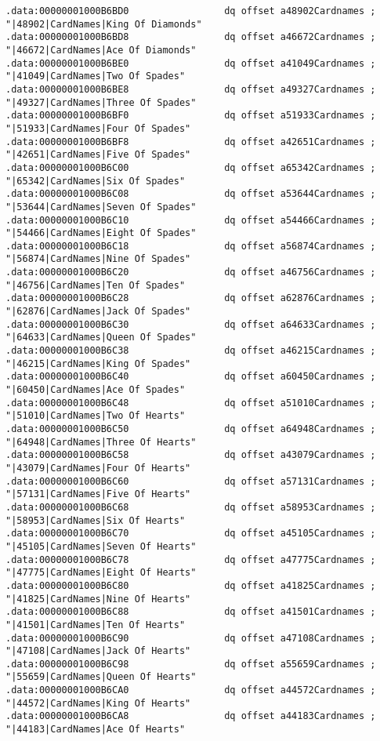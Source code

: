 \begin{lstlisting}
.data:00000001000B6BD0                 dq offset a48902Cardnames ; "|48902|CardNames|King Of Diamonds"
.data:00000001000B6BD8                 dq offset a46672Cardnames ; "|46672|CardNames|Ace Of Diamonds"
.data:00000001000B6BE0                 dq offset a41049Cardnames ; "|41049|CardNames|Two Of Spades"
.data:00000001000B6BE8                 dq offset a49327Cardnames ; "|49327|CardNames|Three Of Spades"
.data:00000001000B6BF0                 dq offset a51933Cardnames ; "|51933|CardNames|Four Of Spades"
.data:00000001000B6BF8                 dq offset a42651Cardnames ; "|42651|CardNames|Five Of Spades"
.data:00000001000B6C00                 dq offset a65342Cardnames ; "|65342|CardNames|Six Of Spades"
.data:00000001000B6C08                 dq offset a53644Cardnames ; "|53644|CardNames|Seven Of Spades"
.data:00000001000B6C10                 dq offset a54466Cardnames ; "|54466|CardNames|Eight Of Spades"
.data:00000001000B6C18                 dq offset a56874Cardnames ; "|56874|CardNames|Nine Of Spades"
.data:00000001000B6C20                 dq offset a46756Cardnames ; "|46756|CardNames|Ten Of Spades"
.data:00000001000B6C28                 dq offset a62876Cardnames ; "|62876|CardNames|Jack Of Spades"
.data:00000001000B6C30                 dq offset a64633Cardnames ; "|64633|CardNames|Queen Of Spades"
.data:00000001000B6C38                 dq offset a46215Cardnames ; "|46215|CardNames|King Of Spades"
.data:00000001000B6C40                 dq offset a60450Cardnames ; "|60450|CardNames|Ace Of Spades"
.data:00000001000B6C48                 dq offset a51010Cardnames ; "|51010|CardNames|Two Of Hearts"
.data:00000001000B6C50                 dq offset a64948Cardnames ; "|64948|CardNames|Three Of Hearts"
.data:00000001000B6C58                 dq offset a43079Cardnames ; "|43079|CardNames|Four Of Hearts"
.data:00000001000B6C60                 dq offset a57131Cardnames ; "|57131|CardNames|Five Of Hearts"
.data:00000001000B6C68                 dq offset a58953Cardnames ; "|58953|CardNames|Six Of Hearts"
.data:00000001000B6C70                 dq offset a45105Cardnames ; "|45105|CardNames|Seven Of Hearts"
.data:00000001000B6C78                 dq offset a47775Cardnames ; "|47775|CardNames|Eight Of Hearts"
.data:00000001000B6C80                 dq offset a41825Cardnames ; "|41825|CardNames|Nine Of Hearts"
.data:00000001000B6C88                 dq offset a41501Cardnames ; "|41501|CardNames|Ten Of Hearts"
.data:00000001000B6C90                 dq offset a47108Cardnames ; "|47108|CardNames|Jack Of Hearts"
.data:00000001000B6C98                 dq offset a55659Cardnames ; "|55659|CardNames|Queen Of Hearts"
.data:00000001000B6CA0                 dq offset a44572Cardnames ; "|44572|CardNames|King Of Hearts"
.data:00000001000B6CA8                 dq offset a44183Cardnames ; "|44183|CardNames|Ace Of Hearts"
\end{lstlisting}

